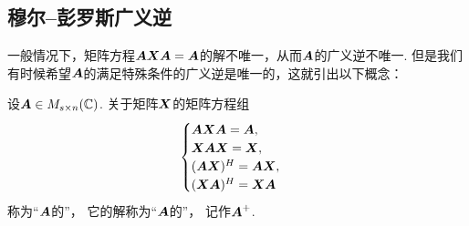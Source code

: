 \subsection{穆尔--彭罗斯广义逆}
一般情况下，矩阵方程\(\boldsymbol{A} \boldsymbol{X} \boldsymbol{A} = \boldsymbol{A}\)的解不唯一，从而\(\boldsymbol{A}\)的广义逆不唯一.
但是我们有时候希望\(\boldsymbol{A}\)的满足特殊条件的广义逆是唯一的，这就引出以下概念：
\begin{definition}
设\(\boldsymbol{A} \in M_{s \times n}(\mathbb{C})\).
关于矩阵\(\boldsymbol{X}\)的矩阵方程组\begin{equation}\label{equation:线性方程组.彭罗斯方程组}
	\begin{cases}
		\boldsymbol{A} \boldsymbol{X} \boldsymbol{A} = \boldsymbol{A}, \\
		\boldsymbol{X} \boldsymbol{A} \boldsymbol{X} = \boldsymbol{X}, \\
		(\boldsymbol{A} \boldsymbol{X})^H = \boldsymbol{A} \boldsymbol{X}, \\
		(\boldsymbol{X} \boldsymbol{A})^H = \boldsymbol{X} \boldsymbol{A}
	\end{cases}
\end{equation}
称为“\(\boldsymbol{A}\)的”，
它的解称为“\(\boldsymbol{A}\)的”，
记作\(\boldsymbol{A}^+\).
\end{definition}

